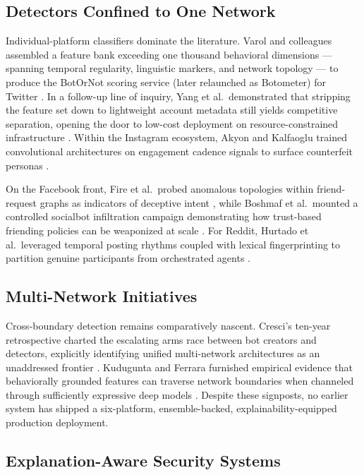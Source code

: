 \documentclass[conference]{IEEEtran}
\begin{document}
\subsection{Detectors Confined to One Network}

Individual-platform classifiers dominate the literature. Varol and colleagues assembled a feature bank exceeding one thousand behavioral dimensions --- spanning temporal regularity, linguistic markers, and network topology --- to produce the BotOrNot scoring service (later relaunched as Botometer) for Twitter \cite{varol2017}. In a follow-up line of inquiry, Yang et al.\ demonstrated that stripping the feature set down to lightweight account metadata still yields competitive separation, opening the door to low-cost deployment on resource-constrained infrastructure \cite{yang2020scalable}. Within the Instagram ecosystem, Akyon and Kalfaoglu trained convolutional architectures on engagement cadence signals to surface counterfeit personas \cite{akyon2019instagram}.

On the Facebook front, Fire et al.\ probed anomalous topologies within friend-request graphs as indicators of deceptive intent \cite{fire2014friend}, while Boshmaf et al.\ mounted a controlled socialbot infiltration campaign demonstrating how trust-based friending policies can be weaponized at scale \cite{boshmaf2011socialbot}. For Reddit, Hurtado et al.\ leveraged temporal posting rhythms coupled with lexical fingerprinting to partition genuine participants from orchestrated agents \cite{hurtado2019bot}.

\subsection{Multi-Network Initiatives}

Cross-boundary detection remains comparatively nascent. Cresci's ten-year retrospective charted the escalating arms race between bot creators and detectors, explicitly identifying unified multi-network architectures as an unaddressed frontier \cite{cresci2020decade}. Kudugunta and Ferrara furnished empirical evidence that behaviorally grounded features can traverse network boundaries when channeled through sufficiently expressive deep models \cite{kudugunta2018deep}. Despite these signposts, no earlier system has shipped a six-platform, ensemble-backed, explainability-equipped production deployment.

\subsection{Explanation-Aware Security Systems}
\end{document}
